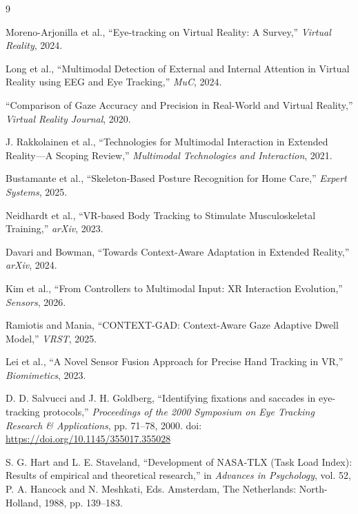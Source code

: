 \documentclass[10pt,twocolumn]{article}
\begin{document}
\begin{thebibliography}{9}

Moreno-Arjonilla et al.,
``Eye-tracking on Virtual Reality: A Survey,''
\textit{Virtual Reality}, 2024.

Long et al.,
``Multimodal Detection of External and Internal Attention in Virtual Reality using EEG and Eye Tracking,''
\textit{MuC}, 2024.

``Comparison of Gaze Accuracy and Precision in Real-World and Virtual Reality,''
\textit{Virtual Reality Journal}, 2020.

J. Rakkolainen et al.,
``Technologies for Multimodal Interaction in Extended Reality---A Scoping Review,''
\textit{Multimodal Technologies and Interaction}, 2021.

Bustamante et al.,
``Skeleton-Based Posture Recognition for Home Care,''
\textit{Expert Systems}, 2025.

Neidhardt et al.,
``VR-based Body Tracking to Stimulate Musculoskeletal Training,''
\textit{arXiv}, 2023.

Davari and Bowman,
``Towards Context-Aware Adaptation in Extended Reality,''
\textit{arXiv}, 2024.

Kim et al.,
``From Controllers to Multimodal Input: XR Interaction Evolution,''
\textit{Sensors}, 2026.

Ramiotis and Mania,
``CONTEXT-GAD: Context-Aware Gaze Adaptive Dwell Model,''
\textit{VRST}, 2025.

Lei et al.,
``A Novel Sensor Fusion Approach for Precise Hand Tracking in VR,''
\textit{Biomimetics}, 2023.

D. D. Salvucci and J. H. Goldberg,
``Identifying fixations and saccades in eye-tracking protocols,''
\textit{Proceedings of the 2000 Symposium on Eye Tracking Research \& Applications},
pp. 71--78, 2000.
doi: \url{https://doi.org/10.1145/355017.355028}

S. G. Hart and L. E. Staveland,
``Development of NASA-TLX (Task Load Index): Results of empirical and theoretical research,''
in \textit{Advances in Psychology}, vol. 52,
P. A. Hancock and N. Meshkati, Eds.
Amsterdam, The Netherlands: North-Holland, 1988, pp. 139--183.

\end{thebibliography}
\end{document}

